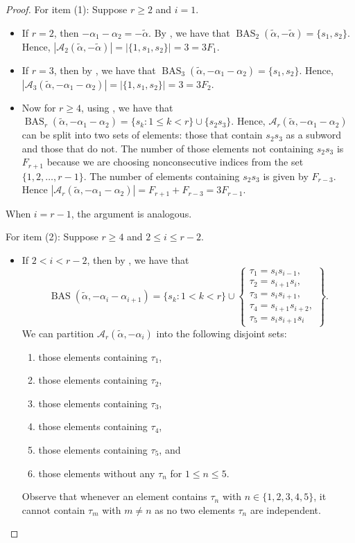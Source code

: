 \documentclass{amsart}
\theoremstyle{definition}
\DeclareMathOperator{\BAS}{BAS}
\newcommand{\hroot}{\tilde{\alpha}}
\newcommand{\calA}{\mathcal{A}}
\begin{document}
\begin{proof}
For item (1): 
Suppose $r\ge 2$ and $i = 1$. 
\begin{itemize}
\item If $r=2$, then $-\alpha_1-\alpha_2=-\hroot$.
By 
,
we have that $\BAS_2(\hroot, -\hroot)=\{s_1,s_2\}$. 
Hence,
$|\calA_2(\hroot,-\hroot)|=|\{1,s_1,s_2\}|=3=3F_{1}$.


\item If $r=3$, then by 
,
we have that $\BAS_3(\hroot, -\alpha_1-\alpha_2)=\{s_1,s_2\}$. Hence,
$|\calA_3(\hroot,-\alpha_1-\alpha_2)|=|\{1,s_1,s_2\}|=3=3F_{2}$.
\item Now for $r\geq 4$, using , we have that $\BAS_r(\hroot,-\alpha_1-\alpha_2) = \{s_k : 1 \leq k < r\} \cup \{s_2s_3\}$. 
Hence, $\mathcal{A}_r(\hroot,-\alpha_1-\alpha_2)$ can be split into two sets of elements: those that contain $s_2s_3$ as a subword and those that do not.
The number of those elements not containing $s_2s_3$ is $F_{r+1}$ because we are choosing nonconsecutive indices from the set $\{1,2,\ldots,r-1\}$.
The number of elements containing $s_2s_3$ is given by $F_{r-3}$. Hence $|\calA_r(\hroot,-\alpha_1-\alpha_2)|=F_{r+1}+F_{r-3}=3F_{r-1}$.
\end{itemize}
When $i=r-1$, the argument is analogous.

\vspace{.1in}

For item (2): Suppose $r\geq 4$ and $2 \leq i \leq r-2$.
\begin{itemize}
 \item If $2 <i < r-2$, then by , we have that \[\BAS(\hroot, -\alpha_i - \alpha_{i+1}) = \{s_k : 1 < k < r\} \cup \left\{\begin{array}{l}
      \tau_1=s_is_{i-1},\\
      \tau_2=s_{i+1}s_i,\\
      \tau_3=s_is_{i+1},\\
      \tau_4=s_{i+1}s_{i+2},\\
      \tau_5=s_is_{i+1}s_i
 \end{array}\right\}.\]
 We can partition $\mathcal{A}_r(\hroot,-\alpha_i)$ into the following disjoint sets:
\begin{enumerate}
    \item those elements containing $\tau_1$,
    \item those elements containing $\tau_2$,
    \item those elements containing $\tau_3$,
    \item those elements containing $\tau_4$,
    \item those elements containing $\tau_5$, and
    \item those elements without any $\tau_n$ for $1\leq n\leq 5$. 
\end{enumerate}
Observe that whenever an element contains $\tau_n$ with $n\in\{1,2,3,4,5\}$, it cannot contain $\tau_m$ with $m \neq n$ as no two elements $\tau_n$ are independent. 
 

\end{itemize}
\end{proof}
\end{document}
